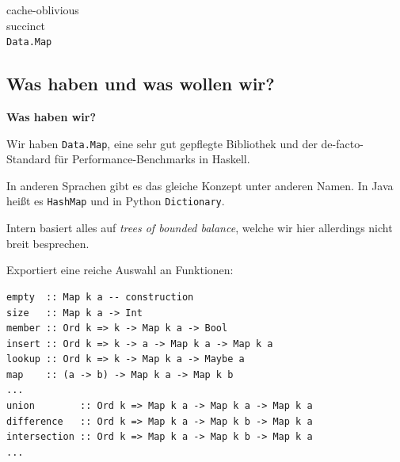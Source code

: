 \documentclass{beamer}
\begin{document}
\begin{frame}
\Large
\begin{center}
cache-oblivious\\
succinct\\
\texttt{Data.Map}
\end{center}
\normalsize
\end{frame}

\subsection{Was haben und was wollen wir?}

\begin{frame}[fragile]
\textbf{Was haben wir?}
\bigskip

Wir haben \texttt{Data.Map}, eine sehr gut gepflegte Bibliothek und der de-facto-Standard für
Performance-Benchmarks in Haskell.
\pause

In anderen Sprachen gibt es das gleiche Konzept unter anderen Namen. In Java heißt es \texttt{HashMap} und in Python \texttt{Dictionary}.\pause

Intern basiert alles auf \emph{trees of bounded balance}, welche wir hier allerdings nicht breit besprechen.\pause\smallskip

Exportiert eine reiche Auswahl an Funktionen:

\begin{verbatim}
empty  :: Map k a -- construction
size   :: Map k a -> Int
member :: Ord k => k -> Map k a -> Bool
insert :: Ord k => k -> a -> Map k a -> Map k a 
lookup :: Ord k => k -> Map k a -> Maybe a 
map    :: (a -> b) -> Map k a -> Map k b 
...
union        :: Ord k => Map k a -> Map k a -> Map k a 
difference   :: Ord k => Map k a -> Map k b -> Map k a
intersection :: Ord k => Map k a -> Map k b -> Map k a 
...
\end{verbatim}
\end{frame}

\end{document}
